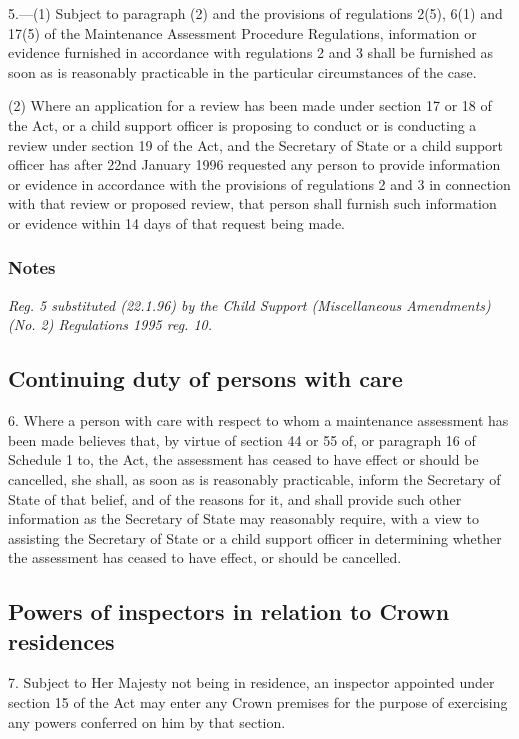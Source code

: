 \documentclass[a4paper]{article}
\newcommand\amendment[1]{\subsubsection*{Notes}{\itshape\frenchspacing\footnotesize #1 \par}}
\begin{document}
5.—(1) Subject to paragraph (2) and the provisions of regulations 2(5), 6(1) and 17(5) of the Maintenance Assessment Procedure Regulations, information or evidence furnished in accordance with regulations 2 and 3 shall be furnished as soon as is reasonably practicable in the particular circumstances of the case.

(2) Where an application for a review has been made under section 17 or 18 of the Act, or a child support officer is proposing to conduct or is conducting a review under section 19 of the Act, and the Secretary of State or a child support officer has after 22nd January 1996 requested any person to provide information or evidence in accordance with the provisions of regulations 2 and 3 in connection with that review or proposed review, that person shall furnish such information or evidence within 14 days of that request being made.

\amendment{
Reg. 5 substituted (22.1.96) by the Child Support (Miscellaneous Amendments) (No. 2) Regulations 1995 reg. 10.
}

\subsection[6. Continuing duty of persons with care]{Continuing duty of persons with care}

6.  Where a person with care with respect to whom a maintenance assessment has been made believes that, by virtue of section 44 or 55 of, or paragraph 16 of Schedule 1 to, the Act, the assessment has ceased to have effect or should be cancelled, she shall, as soon as is reasonably practicable, inform the Secretary of State of that belief, and of the reasons for it, and shall provide such other information as the Secretary of State may reasonably require, with a view to assisting the Secretary of State or a child support officer in determining whether the assessment has ceased to have effect, or should be cancelled.

\subsection[7. Powers of inspectors in relation to Crown residences]{Powers of inspectors in relation to Crown residences}

7.  Subject to Her Majesty not being in residence, an inspector appointed under section 15 of the Act may enter any Crown premises for the purpose of exercising any powers conferred on him by that section.
\end{document}

